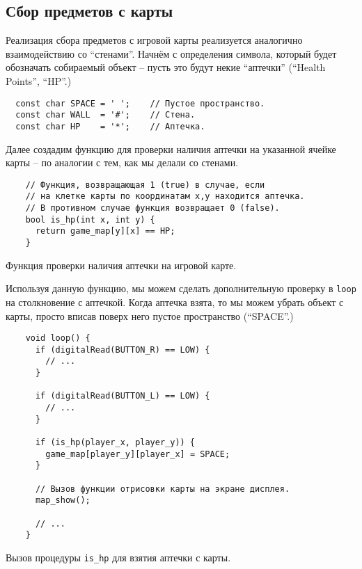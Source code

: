 \documentclass[../sparc.tex]{subfiles}
\begin{document}
\subsection{Сбор предметов с карты}

Реализация сбора предметов с игровой карты реализуется аналогично взаимодействию
со ``стенами''.  Начнём с определения символа, который будет обозначать
собираемый объект -- пусть это будут некие ``аптечки'' (``Health Points'',
``HP''.)

\begin{verbatim}
  const char SPACE = ' ';    // Пустое пространство.
  const char WALL  = '#';    // Стена.
  const char HP    = '*';    // Аптечка.
\end{verbatim}

Далее создадим функцию для проверки наличия аптечки на указанной ячейке карты --
по аналогии с тем, как мы делали со стенами.

\begin{listing}[H]
  \begin{verbatim}
    // Функция, возвращающая 1 (true) в случае, если
    // на клетке карты по координатам x,y находится аптечка.
    // В противном случае функция возвращает 0 (false).
    bool is_hp(int x, int y) {
      return game_map[y][x] == HP;
    }
  \end{verbatim}
  \caption{Функция проверки наличия аптечки на игровой карте.}
  \label{listing:game-dev-is-hp-procedure}
\end{listing}

Используя данную функцию, мы можем сделать дополнительную проверку в
\texttt{loop} на столкновение с аптечкой.  Когда аптечка взята, то мы можем
убрать объект с карты, просто вписав поверх него пустое пространство
(``SPACE''.)

\begin{listing}[H]
  \begin{verbatim}
    void loop() {
      if (digitalRead(BUTTON_R) == LOW) {
        // ...
      }

      if (digitalRead(BUTTON_L) == LOW) {
        // ...
      }

      if (is_hp(player_x, player_y)) {
        game_map[player_y][player_x] = SPACE;
      }

      // Вызов функции отрисовки карты на экране дисплея.
      map_show();

      // ...
    }
  \end{verbatim}
  \caption{Вызов процедуры \texttt{is\_hp} для взятия аптечки с карты.}
  \label{listing:game-dev-is-hp-procedure-call}
\end{listing}
\end{document}
